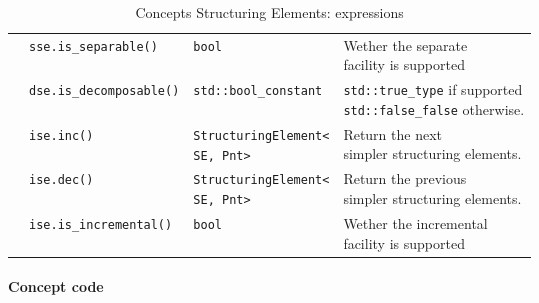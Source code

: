 \begin{table}[htbp]
\begin{scriptsize}
\begin{tabular}{llll}
      \multicolumn{1}{c|}{}                                     & \texttt{sse.is\_separable()}                          & \texttt{bool}                             & \makecell[l]{Wether the separate        \\ facility is supported}\\
      \cline{1-4}
      \multicolumn{1}{c|}{\multirow{4}{*}{\makecell[l]{Incremental                                                                                                                                            \\StructuringElement}}} & \texttt{dse.is\_decomposable()} & \texttt{std::bool\_constant} & \makecell[l]{\texttt{std::true\_type} if supported\\ \texttt{std::false\_false} otherwise.}\\
      \multicolumn{1}{c|}{}                                     & \texttt{ise.inc()}                                    & \makecell[l]{\texttt{StructuringElement<}                                           \\\texttt{SE, Pnt>}} & \makecell[l]{Return the next            \\ simpler structuring elements.}\\
      \multicolumn{1}{c|}{}                                     & \texttt{ise.dec()}                                    & \makecell[l]{\texttt{StructuringElement<}                                           \\\texttt{SE, Pnt>}} & \makecell[l]{Return the previous        \\ simpler structuring elements.}\\
      \multicolumn{1}{c|}{}                                     & \texttt{ise.is\_incremental()}                        & \texttt{bool}                             & \makecell[l]{Wether the incremental     \\ facility is supported}\\
      \cline{1-4}
    \end{tabular}
    \smallskip

    \caption{Concepts Structuring Elements: expressions}
  \end{scriptsize}
  \label{table:concept.se.expressions}
\end{table}

\paragraph{Concept code}

